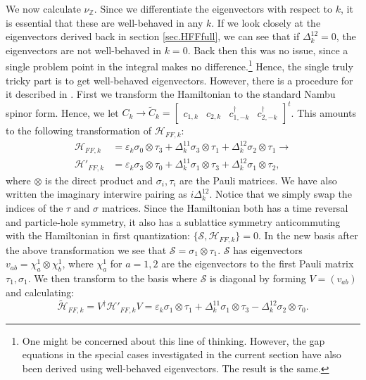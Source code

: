 We now calculate $\nu_{\mathbb{Z}}$. Since we differentiate the eigenvectors with respect to $k$, it is essential that these are well-behaved in any $k$. If we look closely at the eigenvectors derived back in section \ref{sec.HFFfull}, we can see that if $\Delta^{12}_k = 0$, the eigenvectors are not well-behaved in $k = 0$. Back then this was no issue, since a single problem point in the integral makes no difference.\footnote{One might be concerned about this line of thinking. However, the gap equations in the special cases investigated in the current section have also been derived using well-behaved eigenvectors. The result is the same.} Hence, the single truly tricky part is to get well-behaved eigenvectors. However, there is a procedure for it described in \cite{Ryu.Topology}. First we transform the Hamiltonian to the standard Nambu spinor form. Hence, we let $C_k \to \tilde{C}_k = \begin{bmatrix} c_{1,k} & c_{2,k} & c^\dagger_{1,-k} & c^\dagger_{2,-k}  \end{bmatrix}^{t}$. This amounts to the following transformation of $\mathcal{H}_{FF,k}$:
\begin{align}
\mathcal{H}_{FF,k} &= \varepsilon_k \sigma_0 \otimes \tau_3 + \Delta^{11}_k \sigma_3 \otimes \tau_1 + \Delta^{12}_k \sigma_2 \otimes \tau_1 \to \nonumber \\
\mathcal{H}'_{FF,k} &= \varepsilon_k \sigma_3 \otimes \tau_0 + \Delta^{11}_k \sigma_1 \otimes \tau_3 + \Delta^{12}_k \sigma_1 \otimes \tau_2,
\label{eq.Hamiltoniantostandardnambuspinorform} 
\end{align}
where $\otimes$ is the direct product and $\sigma_i, \tau_i$ are the Pauli matrices. We have also written the imaginary interwire pairing as $i\Delta^{12}_k$. Notice that we simply swap the indices of the $\tau$ and $\sigma$ matrices. Since the Hamiltonian both has a time reversal and particle-hole symmetry, it also has a sublattice symmetry anticommuting with the Hamiltonian in first quantization: $\{\mathcal{S}, \mathcal{H}_{FF,k}\} = 0$. In the new basis after the above transformation we see that $\mathcal{S} = \sigma_1\otimes \tau_1$. $\mathcal{S}$ has eigenvectors $v_{ab} = \chi^{1}_a\otimes \chi^{1}_b$, where $\chi^{1}_a$ for $a = 1,2$ are the eigenvectors to the first Pauli matrix $\tau_1, \sigma_1$. We then transform to the basis where $\mathcal{S}$ is diagonal by forming $V = (v_{ab})$ and calculating:
\begin{equation}
\tilde{\mathcal{H}}_{FF,k} = V^\dagger\mathcal{H}'_{FF,k}V = \varepsilon_k \sigma_1\otimes \tau_1 + \Delta^{11}_k \sigma_1\otimes\tau_3 - \Delta^{12}_k\sigma_2\otimes\tau_0. \nonumber 
\end{equation}
